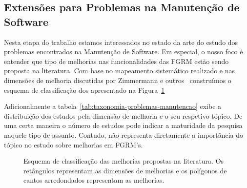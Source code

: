 \subsection{Extensões para Problemas na Manutenção de Software}
\label{sub:extensões_para_problemas_na_manutenção_de_software}

Nesta etapa do trabalho estamos interessados no estado da arte do estudo dos
problemas encontrados na Manutenção de Software. Em especial, o nosso foco é
entender que tipo de melhorias nas funcionalidades das FGRM estão sendo proposta
na literatura. Com base no mapeamento sistemático realizado e nas dimensões de
melhoria discutidas por Zimmermann e outros~\cite{5070993} construímos o esquema
de classificação dos apresentado na
Figura~\ref{fig:diagrama-esquema-dimensao-melhorias}

Adicionalmente a tabela~\ref{tab:taxonomia-problemas-manutencao} exibe a
distribuição dos estudos pela dimensão de melhoria e o seu respetivo tópico. De
uma certa maneira o número de estudos  pode indicar a maturidade da pesquisa
naquele tipo de assunto. Contudo, não representa diretamente a importância do
tópico no estudo sobre melhorias em FGRM's.



\begin{figure}[tb] \centering
	\caption{Esquema de classificação das melhorias propostas na literatura. Os
		retângulos representam as dimensões de melhorias e os polígonos de
		cantos arredondados representam as melhorias.}
	\label{fig:diagrama-esquema-dimensao-melhorias} \end{figure}

